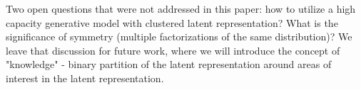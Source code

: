 Two open questions that were not addressed in this paper: how to utilize a high capacity generative model with clustered latent representation? What is the significance of symmetry (multiple factorizations of the same distribution)? We leave that discussion for future work, where we will introduce the concept of "knowledge" - binary partition of the latent representation around areas of interest in the latent representation.


